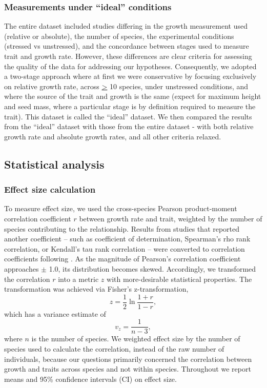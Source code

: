 \documentclass[a4paper,11pt]{article}
\begin{document}
\subsubsection*{Measurements under ``ideal'' conditions}\label{ideal-vs-entire-dataset}

The entire dataset included studies differing in the growth measurement used (relative or absolute), the number of species, the experimental conditions (stressed vs unstressed), and the concordance between stages used to measure trait and growth rate. However, these differences are clear criteria for assessing the quality of the data for addressing our hypotheses. Consequently, we adopted a two-stage approach where at first we were conservative by focusing exclusively on relative growth rate, across \underline{\textgreater} 10 species, under unstressed conditions, and where the source of the trait and growth is the same (expect for maximum height and seed mass, where a particular stage is by definition required to measure the trait). This dataset is called the ``ideal'' dataset. We then compared the results from the ``ideal'' dataset with those from the entire dataset - with both relative growth rate and absolute growth rates, and all other criteria relaxed.

\subsection*{Statistical analysis}\label{statistical-analyses}

\subsubsection*{Effect size calculation}\label{effect-size}

To measure effect size, we used the cross-species Pearson product-moment correlation coefficient $r$ between growth rate and trait, weighted by the number of species contributing to the relationship. Results from studies that reported another coefficient -- such as coefficient of determination, Spearman's rho rank correlation, or Kendall's tau rank correlation -- were converted to correlation coefficients following \citet{Lajeunesse:2013tm}. As the magnitude of Pearson's correlation coefficient approaches $\pm$ 1.0, its distribution becomes skewed. Accordingly, we transformed the correlation $r$ into a metric $z$ with more-desirable statistical properties. The transformation was achieved via Fisher's z-transformation,
\[ z = \frac{1}{2} \ln \frac{1+r}{1-r},\]
which has a variance estimate of
\[ v_z= \frac{1}{n-3},\]
where $n$ is the number of species. We weighted effect size by the number of species used to calculate the correlation, instead of the raw number of individuals, because our questions primarily concerned the correlation between growth and traits across species and not within species. Throughout we report means and 95\% confidence intervals (CI) on effect size.
\end{document}
